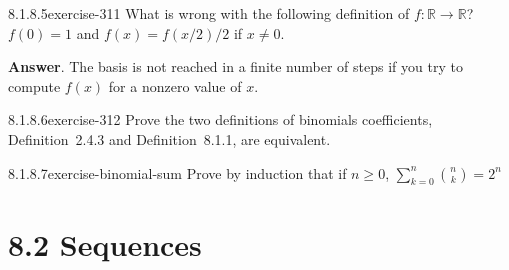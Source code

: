 \documentclass[twoside,10pt,]{book}
\numberwithin{equation}{section}
\begin{document}
\begin{divisionsolution}{8.1.8.5}{}{exercise-311}%
\hypertarget{p-2581}{}%
What is wrong with the following definition of \(f:\mathbb{R}\to \mathbb{R}\)? \(f(0) = 1\) and \(f(x) = f(x/2)/2\) if \(x\neq 0\).%
\par\smallskip%
\noindent\textbf{Answer}.\quad%
\hypertarget{p-2582}{}%
The basis is not reached in a finite number of steps if you try to compute \(f(x)\) for a nonzero value of \(x\).%
\end{divisionsolution}%
\begin{divisionsolution}{8.1.8.6}{}{exercise-312}%
\hypertarget{p-2583}{}%
Prove the two definitions of binomials coefficients, Definition~2.4.3 and Definition~8.1.1, are equivalent.%
\end{divisionsolution}%
\begin{divisionsolution}{8.1.8.7}{}{exercise-binomial-sum}%
\hypertarget{p-2584}{}%
Prove by induction that if \(n \geq 0\), \(\sum_{k=0}^n \binom{n}{k} = 2^n\)%
\end{divisionsolution}%
\section*{8.2 Sequences}
\end{document}
